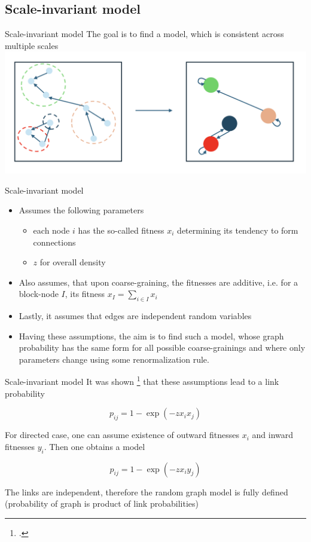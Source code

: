 \documentclass{beamer}
\begin{document}
\subsection{Scale-invariant model}
\begin{frame}{Scale-invariant model}
The goal is to find a model, which is consistent across multiple scales
\centering
\includegraphics[scale=0.35]{img/coarse_graining.png}    
\end{frame}
\begin{frame}{Scale-invariant model}
    \begin{itemize}
        \item Assumes the following parameters
        \begin{itemize}
            \item each node $i$ has the so-called fitness $x_i$ determining its tendency to form connections
            \item $z$ for overall density
        \end{itemize}
        \item Also assumes, that upon coarse-graining, the fitnesses are additive, i.e. for a block-node $I$, its fitness $x_I = \sum_{i\in I} x_i$
        \item Lastly, it assumes that edges are independent random variables
        \item Having these assumptions, the aim is to find such a model, whose graph probability has the same form for all possible coarse-grainings and where only parameters change using some renormalization rule.
    \end{itemize}
\end{frame}

\begin{frame}{Scale-invariant model}
It was shown \footcite{Garuccio2023} that these assumptions lead to a link probability

\begin{equation*}
    p_{ij} = 1 - \exp(-zx_i x_j)
\end{equation*}

For directed case, one can assume existence of outward fitnesses $x_i$ and inward fitnesses $y_i$. Then one obtains a model

\begin{equation*}
    p_{ij} = 1 - \exp(-zx_i y_j)
\end{equation*}

The links are independent, therefore the random graph model is fully defined (probability of graph is product of link probabilities)
\end{frame}
\end{document}
